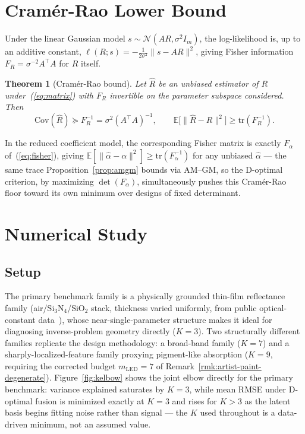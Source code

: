 \documentclass[11pt]{article}
\newtheorem{Theorem}{Theorem}
\begin{document}
\section{Cram\'{e}r-Rao Lower Bound}
\label{sec:crb}

Under the linear Gaussian model $s\sim\mathcal{N}(AR,\sigma^2I_m)$, the log-likelihood is, up to an additive constant, $\ell(R;s)=-\tfrac{1}{2\sigma^2}\|s-AR\|^2$, giving Fisher information $F_R=\sigma^{-2}A^\top A$ for $R$ itself.

\begin{Theorem}[Cram\'{e}r-Rao bound]
\label{thm:crb}
Let $\hat{R}$ be an unbiased estimator of $R$ under~(\ref{eq:matrix}) with $F_R$ invertible on the parameter subspace considered. Then
\begin{equation}
\mathrm{Cov}(\hat{R}) \succeq F_R^{-1} = \sigma^2(A^\top A)^{-1}, \qquad \mathbb{E}\big[\|\hat{R}-R\|^2\big]\ge\mathrm{tr}(F_R^{-1}).
\label{eq:crb}
\end{equation}
\end{Theorem}

In the reduced coefficient model, the corresponding Fisher matrix is exactly $F_\alpha$ of~(\ref{eq:fisher}), giving $\mathbb{E}[\|\hat\alpha-\alpha\|^2]\ge\mathrm{tr}(F_\alpha^{-1})$ for any unbiased $\hat\alpha$ --- the same trace Proposition~\ref{prop:amgm} bounds via AM--GM, so the D-optimal criterion, by maximizing $\det(F_\alpha)$, simultaneously pushes this Cram\'{e}r-Rao floor toward its own minimum over designs of fixed determinant.

\section{Numerical Study}
\label{sec:numerics}

\subsection{Setup}
\label{sec:benchmarks}

The primary benchmark family is a physically grounded thin-film reflectance family (air/Si$_3$N$_4$/SiO$_2$ stack, thickness varied uniformly, from public optical-constant data~\citep{ref17}), whose near-single-parameter structure makes it ideal for diagnosing inverse-problem geometry directly ($K=3$). Two structurally different families replicate the design methodology: a broad-band family ($K=7$) and a sharply-localized-feature family proxying pigment-like absorption ($K=9$, requiring the corrected budget $m_{\mathrm{LED}}=7$ of Remark~\ref{rmk:artist-paint-degenerate}). Figure~\ref{fig:kelbow} shows the joint elbow directly for the primary benchmark: variance explained saturates by $K=3$, while mean RMSE under D-optimal fusion is minimized exactly at $K=3$ and rises for $K>3$ as the latent basis begins fitting noise rather than signal --- the $K$ used throughout is a data-driven minimum, not an assumed value.
\end{document}
